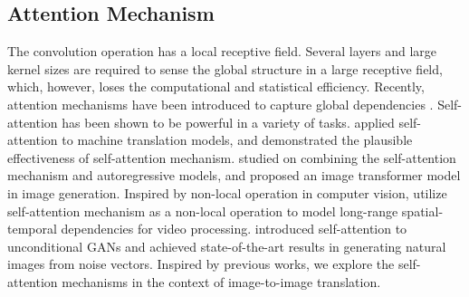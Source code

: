 \subsection{Attention Mechanism}
The convolution operation has a local receptive field. Several layers and large kernel sizes are required to sense the global structure in a large receptive field, which, however, loses the computational and statistical efficiency. Recently, attention mechanisms have been introduced to capture global dependencies \cite{AlignTranslate,ShowAttenTell}.
Self-attention \cite{Non-local,SAGANs} has been shown to be powerful in a variety of tasks.
\cite{Attention} applied self-attention to machine translation models, and demonstrated the plausible effectiveness of self-attention mechanism. 
\cite{Transformer} studied on combining the self-attention mechanism and autoregressive models, and proposed an image transformer model in image generation. 
Inspired by non-local operation in computer vision, \cite{Non-local} utilize self-attention mechanism as a non-local operation to model long-range spatial-temporal dependencies for video processing.
\cite{SAGANs} introduced self-attention to unconditional GANs and achieved state-of-the-art results in generating natural images from noise vectors. Inspired by previous works,  we explore the self-attention mechanisms in the context of image-to-image translation. 

